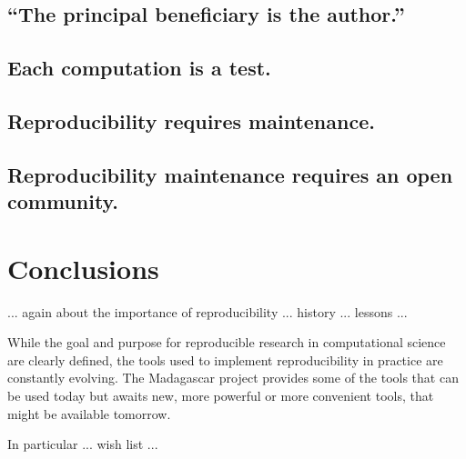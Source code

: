 \subsection{``The principal beneficiary is the author.''}

\subsection{Each computation is a test.}

\subsection{Reproducibility requires maintenance.}

\subsection{Reproducibility maintenance requires an open community.}

\section{Conclusions}

... again about the importance of reproducibility ... history
... lessons ...

While the goal and purpose for reproducible research in computational
science are clearly defined, the tools used to implement
reproducibility in practice are constantly evolving. The Madagascar
project provides some of the tools that can be used today but awaits
new, more powerful or more convenient tools, that might be available
tomorrow.

In particular ... wish list ...


